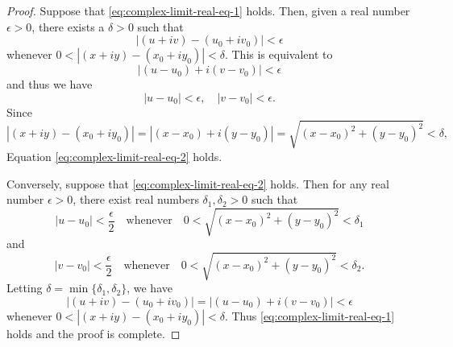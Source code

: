 \begin{proof}
    Suppose that \eqref{eq:complex-limit-real-eq-1} holds. Then, given a real number \(\epsilon > 0\), there exists a \(\delta > 0\) such that
    \[
        |(u + iv) - (u_0 + iv_0)|  < \epsilon
    \]
    whenever \(0 < |(x + iy) - (x_0 + iy_0)| < \delta\). This is equivalent to
    \[
        |(u - u_0) + i(v - v_0)| < \epsilon
    \]
    and thus we have
    \[
        |u - u_0| < \epsilon, \quad |v - v_0| < \epsilon.
    \]
    Since
    \[
        |(x + iy) - (x_0 + iy_0)| = |(x - x_0) + i(y - y_0)| = \sqrt{(x - x_0)^2 + (y - y_0)^2} < \delta,
    \]
    Equation \eqref{eq:complex-limit-real-eq-2} holds.

    Conversely, suppose that \eqref{eq:complex-limit-real-eq-2} holds. Then for any real number \(\epsilon > 0\), there exist real numbers \(\delta_1, \delta_2 > 0\) such that
    \[
        |u - u_0| < \frac{\epsilon}{2} \quad \text{whenever} \quad 0 < \sqrt{(x - x_0)^2 + (y - y_0)^2} < \delta_1
    \]
    and
    \[
        |v - v_0| < \frac{\epsilon}{2} \quad \text{whenever} \quad 0 < \sqrt{(x - x_0)^2 + (y - y_0)^2} < \delta_2.
    \]
    Letting \(\delta = \min\{\delta_1, \delta_2\}\), we have
    \[
        |(u + iv) - (u_0 + iv_0)| = |(u - u_0) + i(v - v_0)| < \epsilon
    \]
    whenever \(0 < |(x + iy) - (x_0 + iy_0)| < \delta\). Thus \eqref{eq:complex-limit-real-eq-1} holds and the proof is complete.
\end{proof}

